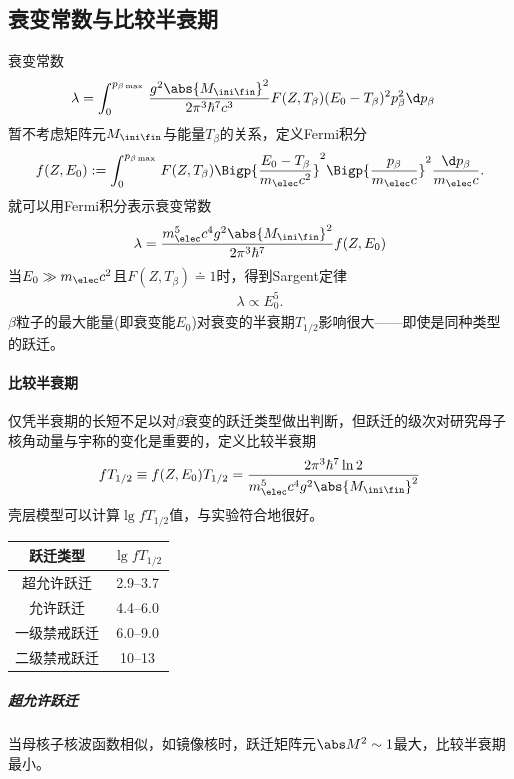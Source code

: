 \subsection{衰变常数与比较半衰期}

衰变常数
\begin{align*}
	\lambda&=\int_0^{p_{\beta\max{}}}\frac{g^2\abs{M_{\ini\fin}}^2}{2\pi^3\hbar^7c^3}F(Z,T_\beta)(E_0-T_\beta)^2p_\beta^2\d p_\beta
\end{align*}
暂不考虑矩阵元$M_{\ini\fin}$与能量$T_\beta$的关系，定义Fermi积分
\begin{align}
	f(Z,E_0):=\int_0^{p_{\beta\max{}}}F(Z,T_\beta)\Bigp{\frac{E_0-T_\beta}{m_\elec c^2}}^2\Bigp{\frac{p_\beta}{m_\elec c}}^2\frac{\d p_\beta}{m_\elec c}.
\end{align}
就可以用Fermi积分表示衰变常数
\[
	\lambda=\frac{m_\elec^5c^4g^2\abs{M_{\ini\fin}}^2}{2\pi^3\hbar^7}f(Z,E_0)
\]
当$E_0\gg m_\elec c^2$且$F(Z,T_\beta)\doteq 1$时，得到Sargent定律
\begin{align}
	\lambda\propto E_0^5.
\end{align}
$\beta$粒子的最大能量(即衰变能$E_0$)对衰变的半衰期$T_{1/2}$影响很大——即使是同种类型的跃迁。
\paragraph{比较半衰期}仅凭半衰期的长短不足以对$\beta$衰变的跃迁类型做出判断，但跃迁的级次对研究母子核角动量与宇称的变化是重要的，定义比较半衰期
\begin{align}
	fT_{1/2}\equiv f(Z,E_0)T_{1/2}=\frac{2\pi^3\hbar^7\ln2}{m_\elec^5c^4g^2\abs{M_{\ini\fin}}^2}
\end{align}
壳层模型可以计算$\lg fT_{1/2}$值，与实验符合地很好。
\begin{center}
	\begin{tabular}{cc}
		\toprule
		跃迁类型&$\lg fT_{1/2}$\\
		\midrule
		超允许跃迁&\numrange{2.9}{3.7}\\
		允许跃迁&\numrange{4.4}{6.0}\\
		一级禁戒跃迁&\numrange{6.0}{9.0}\\
		二级禁戒跃迁&\numrange{10}{13}\\
		\bottomrule
	\end{tabular}
\end{center}
\subparagraph{超允许跃迁}当母核子核波函数相似，如镜像核时，跃迁矩阵元$\abs M^2\sim 1$最大，比较半衰期最小。

